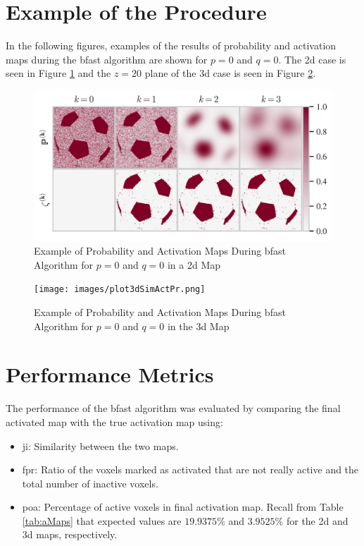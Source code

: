 \newpage

\section{Example of the Procedure}

In the following figures, examples of the results of probability and activation maps during 
the \gls{bfast} algorithm are shown for $p=0$ and $q=0$. The \gls{2d} case is seen in 
Figure \ref{fig:bfastEx2D} and the $z=20$ plane of the \gls{3d} case is seen in 
Figure \ref{fig:bfastEx3D}.

\begin{figure}[htbp!]
\centering
\includegraphics{images/bfastEx2D.png}
\caption{Example of Probability and Activation Maps During \gls{bfast} Algorithm for $p=0$ and $q=0$ in a \gls{2d} Map}
\label{fig:bfastEx2D}
\end{figure}

\begin{figure}[htbp!]
\centering
\texttt{[image: images/plot3dSimActPr.png]}
\caption{Example of Probability and Activation Maps During \gls{bfast} Algorithm for $p=0$ and $q=0$ in the \gls{3d} Map}
\label{fig:bfastEx3D}
\end{figure}

\newpage

\section{Performance Metrics}

The performance of the \gls{bfast} algorithm was evaluated by comparing the final activated map with the true activation map using:

\begin{itemize}
\item \gls{ji}: Similarity between the two maps.
\item \gls{fpr}: Ratio of the voxels marked as activated that are not really active and the 
total number of inactive voxels.
\item \gls{poa}: Percentage of active voxels in final activation map. Recall from Table \ref{tab:aMaps} 
that expected values are $19.9375 \%$ and $3.9525 \%$ for the \gls{2d} and \gls{3d} maps, respectively.
\end{itemize}

